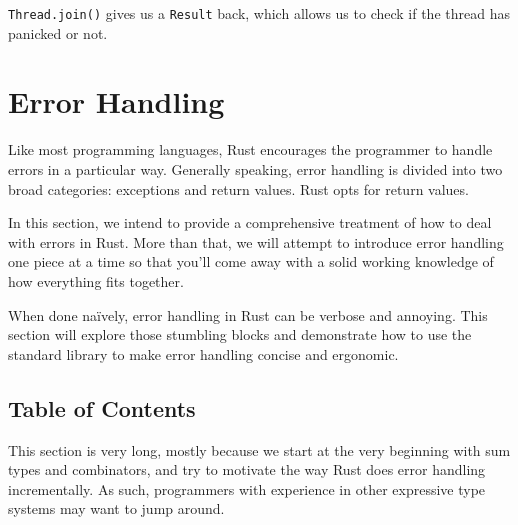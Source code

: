 \documentclass[a4paper,]{book}
\renewcommand*{\hypertarget}[3][\ar]{%
  \def\ar{#2}%
  \label{#1}%
  #3}
\begin{document}
\texttt{Thread.join()} gives us a \texttt{Result} back, which allows us
to check if the thread has panicked or not.

\hypertarget{sec--error-handling}{\section{Error
Handling}\label{sec--error-handling}}

Like most programming languages, Rust encourages the programmer to
handle errors in a particular way. Generally speaking, error handling is
divided into two broad categories: exceptions and return values. Rust
opts for return values.

In this section, we intend to provide a comprehensive treatment of how
to deal with errors in Rust. More than that, we will attempt to
introduce error handling one piece at a time so that you'll come away
with a solid working knowledge of how everything fits together.

When done naïvely, error handling in Rust can be verbose and annoying.
This section will explore those stumbling blocks and demonstrate how to
use the standard library to make error handling concise and ergonomic.

\subsection{Table of Contents}\label{table-of-contents}

This section is very long, mostly because we start at the very beginning
with sum types and combinators, and try to motivate the way Rust does
error handling incrementally. As such, programmers with experience in
other expressive type systems may want to jump around.
\end{document}
